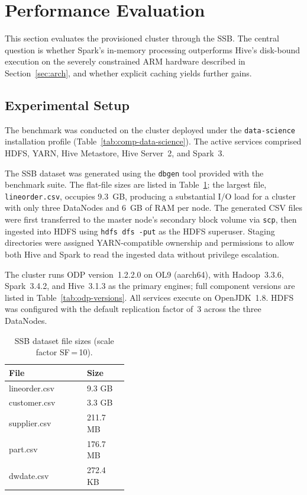 \section{Performance Evaluation}
\label{sec:use-case}

This section evaluates the provisioned cluster through the SSB. The central question is whether Spark's in-memory
processing outperforms Hive's disk-bound execution on the severely constrained
ARM hardware described in Section~\ref{sec:arch}, and whether explicit caching
yields further gains.

\subsection{Experimental Setup}

The benchmark was conducted on the cluster deployed under the
\texttt{data-science} installation profile
(Table~\ref{tab:comp-data-science}). The active
services comprised HDFS, YARN, Hive Metastore, Hive Server~2, and Spark~3.

The SSB dataset was generated using the
\texttt{dbgen} tool provided with the benchmark suite. The flat-file sizes are
listed in Table~\ref{tab:ssb-dataset-sizes}; the largest file,
\texttt{lineorder.csv}, occupies 9.3~GB, producing a substantial I/O load for a
cluster with only three DataNodes and 6~GB of RAM per node. The generated CSV
files were first transferred to the master node's secondary block volume via
\texttt{scp}, then ingested into HDFS using \texttt{hdfs dfs~-put} as the HDFS
superuser. Staging directories were assigned YARN-compatible ownership and
permissions to allow both Hive and Spark to read the ingested data without
privilege escalation.

The cluster runs ODP version~1.2.2.0 on OL9 (aarch64), with
Hadoop~3.3.6, Spark~3.4.2, and Hive~3.1.3 as the primary engines; full
component versions are listed in Table~\ref{tab:odp-versions}. All services
execute on OpenJDK~1.8. HDFS was configured with the default replication factor
of~3 across the three DataNodes.

\begin{table}[htbp]
  \centering
  \caption{SSB dataset file sizes (scale factor SF\,=\,10).}
  \label{tab:ssb-dataset-sizes}
  \renewcommand{\arraystretch}{1.2}
  \begin{tabular}{ p{0.25\linewidth} p{0.15\linewidth} }
    \hline
    \textbf{File} & \textbf{Size} \\
    \hline
    lineorder.csv & 9.3 GB \\
    customer.csv  & 3.3 GB \\
    supplier.csv  & 211.7 MB \\
    part.csv      & 176.7 MB \\
    dwdate.csv    & 272.4 KB \\
    \hline
  \end{tabular}
\end{table}

